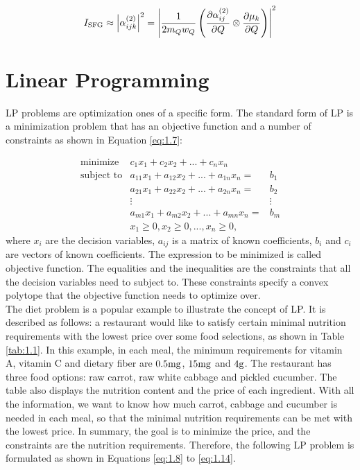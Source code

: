 \begin{equation} \label{eq:1.6}
I_{\rm SFG} \approx \left| \alpha^{(2)}_{ijk} \right|^{2}
= \left| \frac{1}{2m_{Q}w_{Q}} \left( \frac{\partial\alpha^{(2)}_{ij}}{\partial Q} \otimes \frac{\partial\mu_{k}}{\partial Q} \right) \right|^{2}
\end{equation}

\section{Linear Programming \cite{UULP}}
LP problems are optimization ones of a specific form. The standard form of LP is a minimization problem that has an objective function and a number of constraints as shown in Equation \ref{eq:1.7}:

\begin{eqnarray}  \label{eq:1.7}
 \text{minimize} & c_{1}x_{1} + c_{2}x_{2} + ... + c_{n} x_{n}  \nonumber \\
 \text{subject to} & a_{11} x_{1} + a_{12} x_{2}+ ... + a_{1n} x_{n} = & b_{1} \nonumber \\
& a_{21} x_{1} + a_{22} x_{2} + ... + a_{2n} x_{n} = & b_{2} \nonumber \\
&\vdots                                   &\vdots \nonumber \\
& a_{m1} x_{1} + a_{m2} x_{2} + ... + a_{mn} x_{n} = & b_{m} \nonumber \\
& x_{1} \geq 0, x_{2} \geq 0, ... ,x_{n} \geq 0, 
\end{eqnarray} 
where $x_{i}$ are the decision variables, $a_{ij}$ is a matrix of known coefficients, $b_{i}$ and $c_{i}$ are vectors of known coefficients. The expression to be minimized is called objective function. The equalities and the inequalities are the constraints that all the decision variables need to subject to. These constraints specify a convex polytope that the objective function needs to optimize over. \\ 

The diet problem is a popular example to illustrate the concept of LP. It is described as follows: a restaurant would like to satisfy certain minimal nutrition requirements with the lowest price over some food selections, as shown in Table \ref{tab:1.1}. In this example, in each meal, the minimum requirements for vitamin A, vitamin C and dietary fiber are $0.5 \rm mg$, $15 \rm mg$ and $4 \rm g$. The restaurant has three food options: raw carrot, raw white cabbage and pickled cucumber. The table also displays the nutrition content and the price of each ingredient. With all the information, we want to know how much carrot, cabbage and cucumber is needed in each meal, so that the minimal nutrition requirements can be met with the lowest price. In summary, the goal is to minimize the price, and the constraints are the nutrition requirements. Therefore, the following LP problem is formulated as shown in Equations \ref{eq:1.8} to \ref{eq:1.14}.


